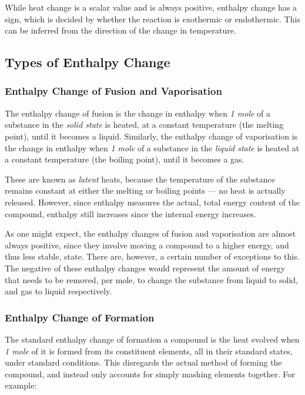		While heat change is a scalar value and is always positive, enthalpy change has a sign, which is decided by whether the reaction is
		exothermic or endothermic. This can be inferred from the direction of the change in temperature.


	\subsection{Types of Enthalpy Change}

		\subsubsection{Enthalpy Change of Fusion and Vaporisation}

			The enthalpy change of fusion is the change in enthalpy when \textit{1 mole} of a substance in the \textit{solid state} is heated,
			at a constant temperature (the melting point), until it becomes a liquid. Similarly, the enthalpy change of vaporisation is the
			change in enthalpy when \textit{1 mole} of a substance in the \textit{liquid state} is heated at a constant temperature
			(the boiling point), until it becomes a gas.

			These are known as \textit{latent} heats, because the temperature of the substance remains constant at either the melting or
			boiling points — no heat is actually released. However, since enthalpy measures the actual, total energy content of the compound,
			enthalpy still increases since the internal energy increases.

			As one might expect, the enthalpy changes of fusion and vaporisation are almost always positive, since they involve moving a
			compound to a higher energy, and thus less stable, state. There are, however, a certain number of exceptions to this.
			The negative of these enthalpy changes would represent the amount of energy that needs to be removed, per mole, to change the
			substance from liquid to solid, and gas to liquid respectively.



		\subsubsection{Enthalpy Change of Formation}

			The standard enthalpy change of formation a compound is the heat evolved when \textit{1 mole} of it is formed from its constituent
			elements, all in their standard states, under standard conditions. This disregards the actual method of forming the compound, and
			instead only accounts for simply mashing elements together. For example:

